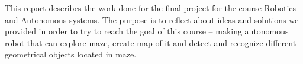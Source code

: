 This report describes the work done for the final project for the course Robotics and Autonomous systems. The purpose is to reflect about ideas and solutions we provided in order to try to reach the goal of this course – making autonomous robot that can explore maze, create map of it and detect and recognize different geometrical objects located in maze.
